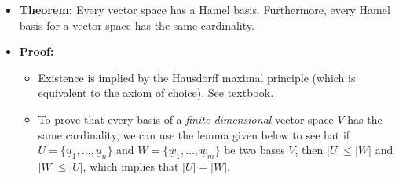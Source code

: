 \documentclass[11pt,twoside]{report}
\newcommand{\vecnot}{\underline}
\begin{document}
\begin{itemize}
\item \textbf{Theorem:}  
Every vector space has a Hamel basis. Furthermore, every Hamel basis for a vector space has the same cardinality. 



\item \textbf{Proof:} 
\begin{itemize}

\item Existence is implied by the Hausdorff maximal principle (which is equivalent to the axiom of choice). See textbook. 

\item To  prove that every basis of a  \emph{finite dimensional} vector space $V$ has the same cardinality, we can use the lemma given below to see hat if  $U = \{\vecnot{u}_1, \dots, \vecnot{u}_n\}$ and $W = \{\vecnot{w}_1, \dots, \vecnot{w}_m\}$ be two bases $V$, then $|U| \le |W|$ and $|W| \le | U|$, which implies that $|U| = |W|$. 


\end{itemize}
\end{itemize}
\end{document}
